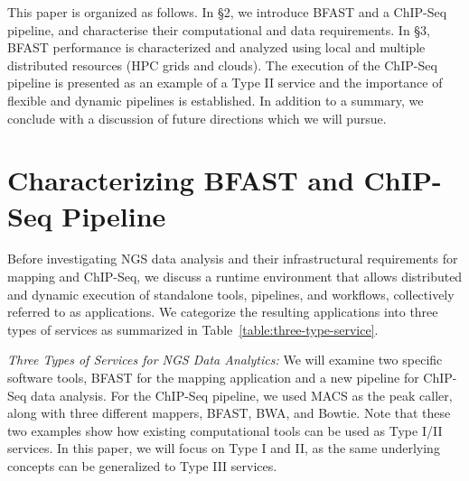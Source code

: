 \documentclass{cpeauth}
\begin{document}

This paper is organized as follows.  In \S2, we introduce BFAST and a
ChIP-Seq pipeline, and characterise their computational and data
requirements.  In \S3, BFAST performance is characterized and analyzed
using local and multiple distributed resources (HPC grids and
clouds). The execution of the ChIP-Seq pipeline is presented as an
example of a Type II service and the importance of flexible and
dynamic pipelines is established. In addition to a summary, we
conclude with a discussion of future directions which we will pursue.

\section{Characterizing BFAST and ChIP-Seq Pipeline}

Before investigating NGS data analysis and their infrastructural
requirements for mapping and ChIP-Seq, we discuss a runtime
environment that allows distributed and dynamic execution of
standalone tools, pipelines, and workflows, collectively referred to
as applications.  We categorize the resulting applications into three
types of services as summarized in
Table~\ref{table:three-type-service}.

{\it Three Types of Services for NGS Data Analytics:} We will examine
two specific software tools, BFAST for the mapping application and a
new pipeline for ChIP-Seq data analysis. For the ChIP-Seq pipeline, we
used MACS as the peak caller, along with three different mappers,
BFAST, BWA, and Bowtie.  Note that these two examples show how
existing computational tools can be used as Type I/II services. In
this paper, we will focus on Type I and II, as the same underlying
concepts can be generalized to Type III services.
\end{document}
